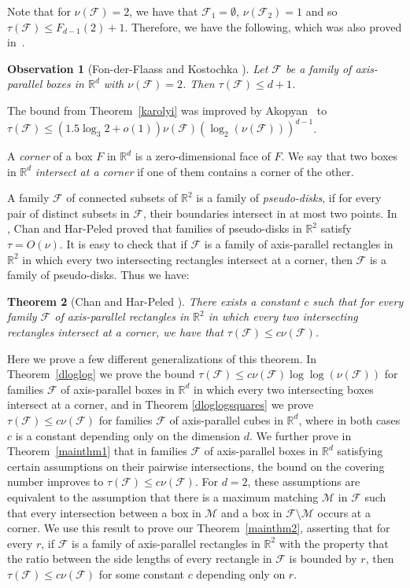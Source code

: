 \documentclass[12pt]{amsart}
\theoremstyle{plain}
\newtheorem{theorem}{Theorem}[section]
\newtheorem{observation}[theorem]{Observation}
\theoremstyle{definition}
\theoremstyle{remark}
\newcommand{\F}{\mathcal{F}}
\newcommand{\M}{\mathcal{M}}
\newcommand{\R}{\mathbb{R}}
\begin{document}
Note that for $\nu(\F) = 2$, we have that $\F_1 = \emptyset$, $\nu(\F_2) = 1$ and so $\tau(\F) \leq F_{d-1}(2) + 1$. Therefore, we have the following, which was also proved in~\cite{fonderflaass}. 
\begin{observation}[Fon-der-Flaass and Kostochka \cite{fonderflaass}] \label{obs:nutwo}
Let $\F$ be a family of axis-parallel boxes in $\R^d$ with $\nu(\F) = 2$. Then $\tau(\F) \leq d+1$. 
\end{observation}

The bound from Theorem~\ref{karolyi} was improved by Akopyan~\cite{akopyan} to $\tau(\F) \leq (1.5 \log_3 2 + o(1)) \nu(\F) \left(\log_2\left(\nu(\F)\right)\right)^{d-1}$. 


A \emph{corner} of a box $F$ in $\R^d$ is a zero-dimensional face of $F$. 
We say that two boxes in $\R^d$ {\em intersect at a corner} if one of them contains a corner of the other.

A family $\F$ of connected subsets of $\R^2$ is a family of \emph{pseudo-disks}, if for every pair of distinct subsets in $\F$, their boundaries intersect in at most two points. In \cite{chanhar}, Chan and Har-Peled proved that families of pseudo-disks in $\R^2$ satisfy $\tau =O(\nu)$.   It is easy to check that if $\F$ is a family of axis-parallel rectangles in $\R^2$ in which every two intersecting rectangles intersect at a corner, then $\F$ is a family of pseudo-disks. Thus we have:

\begin{theorem}[Chan and Har-Peled \cite{chanhar}]\label{chenhar}
There exists a constant $c$ such that for every family $\F$ of axis-parallel rectangles in $\R^2$ in which every two intersecting rectangles intersect at a corner, we have that $\tau(\F)\le c\nu(\F)$. 
\end{theorem}

Here we prove a few different generalizations of this theorem. In Theorem~\ref{dloglog} we prove the bound  $\tau(\F) \leq  c\nu(\F)\log\log(\nu(\F))$ for families $\F$ of axis-parallel boxes in $\R^d$ in which every two intersecting boxes intersect at a corner, and in Theorem \ref{dloglogsquares} we prove $\tau(\F) \leq c \nu(\F)$ for families $\F$ of  axis-parallel cubes in $\R^d$, where in both cases $c$ is a constant depending only on the dimension $d$. We further prove in Theorem~\ref{mainthm1} that in families $\F$ of axis-parallel boxes in $\R^d$ satisfying certain assumptions on their pairwise intersections, the bound on the covering number improves to $\tau(\F) \leq c \nu(\F)$. For $d=2$, these assumptions are equivalent to the assumption that there is a maximum matching $\M$ in $\F$ such that every intersection between a box in $\M$ and a box in $\F \setminus \M$ occurs at a corner. We use this result to prove our Theorem~\ref{mainthm2}, asserting that for every $r$, if $\F$ is a family of axis-parallel rectangles in $\R^2$ with the property that the ratio between the side lengths of every rectangle in $\F$ is bounded by $r$, then $\tau(\F) \leq c \nu(\F)$ for some constant $c$ depending only on $r$. 
\end{document}
